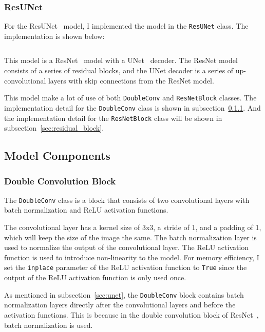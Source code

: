 \subsubsection{ResUNet}

For the ResUNet~\cite{ResUNet} model, I implemented the model in the \texttt{ResUNet} class. The implementation is shown below:

\inputminted[firstline=23]{python}{../src/models/resnet34_unet.py}

This model is a ResNet~\cite{ResNet} model with a UNet~\cite{UNet} decoder.
The ResNet model consists of a series of residual blocks, and the UNet decoder is a series of up-convolutional layers with skip connections from the ResNet model.

This model make a lot of use of both \texttt{DoubleConv} and \texttt{ResNetBlock} classes.
The implementation detail for the \texttt{DoubleConv} class is shown in subsection~\ref{sec:double_conv}.
And the implementation detail for the \texttt{ResNetBlock} class will be shown in subsection~\ref{sec:residual_block}.

\subsection{Model Components}

\subsubsection{Double Convolution Block}
\label{sec:double_conv}

The \texttt{DoubleConv} class is a block that consists of two convolutional layers with batch normalization and ReLU activation functions.

The convolutional layer has a kernel size of 3x3, a stride of 1, and a padding of 1, which will keep the size of the image the same.
The batch normalization layer is used to normalize the output of the convolutional layer.
The ReLU activation function is used to introduce non-linearity to the model.
For memory efficiency, I set the \texttt{inplace} parameter of the ReLU activation function to \texttt{True} since the output of the ReLU activation function is only used once.

As mentioned in subsection~\ref{sec:unet}, the \texttt{DoubleConv} block contains batch normalization layers directly after the convolutional layers and before the activation functions.
This is because in the double convolution block of ResNet~\cite{ResNet}, batch normalization is used.

